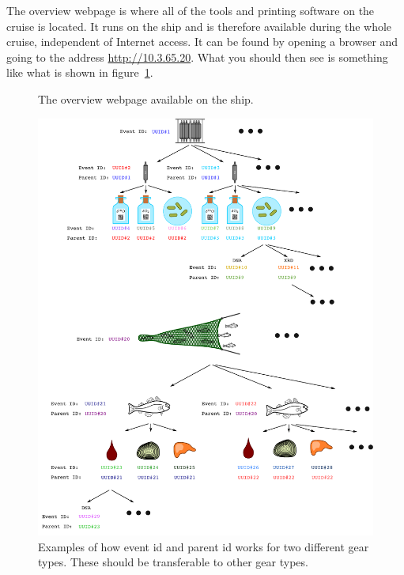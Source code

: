 \documentclass[a4paper,english, 11pt]{article}
\begin{document}
The overview webpage is where all of the tools and printing software on the cruise is located. It runs on the ship and is therefore available during the whole cruise, independent of Internet access. 
It can be found by opening a browser and going to the address \url{http://10.3.65.20}. What you should then see is something like what is shown in figure~\ref{fig:Printing_overview}.

\begin{figure}[htb]
    \caption{\label{fig:Printing_overview}
        The overview webpage available on the ship.
    }
\end{figure}


\begin{figure}[htbp]
    \centering
    \includegraphics[width=1\textwidth]{Labeling.pdf}
    \caption{\label{fig:parent_uuid}
       Examples of how event id and parent id works for two different gear types. These should be transferable to other gear types.
    }
\end{figure}
\end{document}
